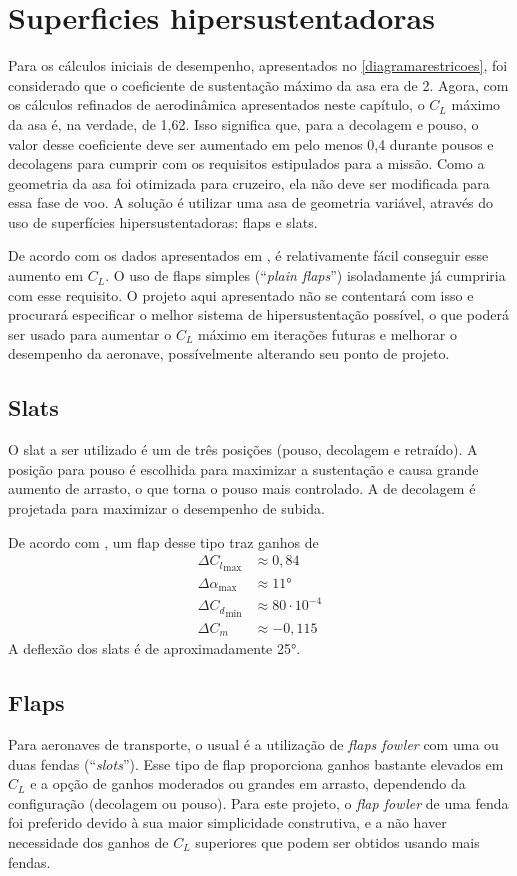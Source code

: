 \section{Superficies hipersustentadoras}
Para os cálculos iniciais de desempenho, apresentados no \autoref{diagramarestricoes}, foi considerado que o coeficiente de sustentação máximo da asa era de 2.
Agora, com os cálculos refinados de aerodinâmica apresentados neste capítulo, o $C_L$ máximo da asa é, na verdade, de 1,62.
Isso significa que, para a decolagem e pouso, o valor desse coeficiente deve ser aumentado em pelo menos 0,4 durante pousos e decolagens para cumprir com os requisitos estipulados para a missão.
Como a geometria da asa foi otimizada para cruzeiro, ela não deve ser modificada para essa fase de voo.
A solução é utilizar uma asa de geometria variável, através do uso de superfícies hipersustentadoras: flaps e slats.

De acordo com os dados apresentados em \cite{gudmundsson}, é relativamente fácil conseguir esse aumento em $C_L$.
O uso de flaps simples (``\emph{plain flaps}'')  isoladamente já cumpriria com esse requisito.
O projeto aqui apresentado não se contentará com isso e procurará especificar o melhor sistema de hipersustentação possível, o que poderá ser usado para aumentar o $C_L$ máximo em iterações futuras e melhorar o desempenho da aeronave, possívelmente alterando seu ponto de projeto.

\subsection{Slats}
O slat a ser utilizado é um de três posições (pouso, decolagem e retraído).
A posição para pouso é escolhida para maximizar a sustentação e causa grande aumento de arrasto, o que torna o pouso mais controlado.
A de decolagem é projetada para maximizar o desempenho de subida.

De acordo com \cite{gudmundsson}, um flap desse tipo traz ganhos de
\begin{align}
    \Delta {C_l}_{\max} &\approx {0,84} \\
    \Delta {\alpha}_{\max} &\approx \ang{11} \\
    \Delta {C_d}_{\min} &\approx 80\cdot 10^{-4} \\
    \Delta {C_m} &\approx -{0,115}
\end{align}
A deflexão dos slats é de aproximadamente \ang{25}.

\subsection{Flaps}
Para aeronaves de transporte, o usual é a utilização de \emph{flaps fowler} com uma ou duas fendas (``\emph{slots}'').
Esse tipo de flap proporciona ganhos bastante elevados em $C_L$ e a opção de ganhos moderados ou grandes em arrasto, dependendo da configuração (decolagem ou pouso).
Para este projeto, o \emph{flap fowler} de uma fenda foi preferido devido à sua maior simplicidade construtiva, e a não haver necessidade dos ganhos de $C_L$ superiores que podem ser obtidos usando mais fendas.

